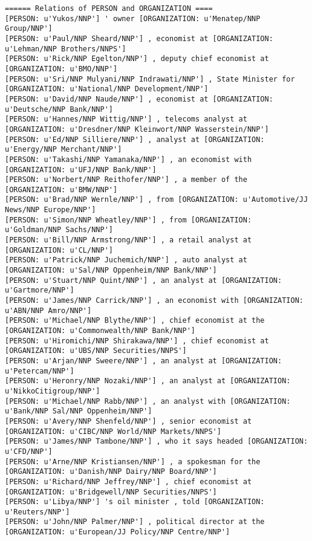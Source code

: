 \documentclass[12pt]{report}
\begin{document}
\begin{scriptsize}
\begin{verbatim}
====== Relations of PERSON and ORGANIZATION ====
[PERSON: u'Yukos/NNP'] ' owner [ORGANIZATION: u'Menatep/NNP Group/NNP']
[PERSON: u'Paul/NNP Sheard/NNP'] , economist at [ORGANIZATION: u'Lehman/NNP Brothers/NNPS']
[PERSON: u'Rick/NNP Egelton/NNP'] , deputy chief economist at [ORGANIZATION: u'BMO/NNP']
[PERSON: u'Sri/NNP Mulyani/NNP Indrawati/NNP'] , State Minister for [ORGANIZATION: u'National/NNP Development/NNP']
[PERSON: u'David/NNP Naude/NNP'] , economist at [ORGANIZATION: u'Deutsche/NNP Bank/NNP']
[PERSON: u'Hannes/NNP Wittig/NNP'] , telecoms analyst at [ORGANIZATION: u'Dresdner/NNP Kleinwort/NNP Wasserstein/NNP']
[PERSON: u'Ed/NNP Silliere/NNP'] , analyst at [ORGANIZATION: u'Energy/NNP Merchant/NNP']
[PERSON: u'Takashi/NNP Yamanaka/NNP'] , an economist with [ORGANIZATION: u'UFJ/NNP Bank/NNP']
[PERSON: u'Norbert/NNP Reithofer/NNP'] , a member of the [ORGANIZATION: u'BMW/NNP']
[PERSON: u'Brad/NNP Wernle/NNP'] , from [ORGANIZATION: u'Automotive/JJ News/NNP Europe/NNP']
[PERSON: u'Simon/NNP Wheatley/NNP'] , from [ORGANIZATION: u'Goldman/NNP Sachs/NNP']
[PERSON: u'Bill/NNP Armstrong/NNP'] , a retail analyst at [ORGANIZATION: u'CL/NNP']
[PERSON: u'Patrick/NNP Juchemich/NNP'] , auto analyst at [ORGANIZATION: u'Sal/NNP Oppenheim/NNP Bank/NNP']
[PERSON: u'Stuart/NNP Quint/NNP'] , an analyst at [ORGANIZATION: u'Gartmore/NNP']
[PERSON: u'James/NNP Carrick/NNP'] , an economist with [ORGANIZATION: u'ABN/NNP Amro/NNP']
[PERSON: u'Michael/NNP Blythe/NNP'] , chief economist at the [ORGANIZATION: u'Commonwealth/NNP Bank/NNP']
[PERSON: u'Hiromichi/NNP Shirakawa/NNP'] , chief economist at [ORGANIZATION: u'UBS/NNP Securities/NNPS']
[PERSON: u'Arjan/NNP Sweere/NNP'] , an analyst at [ORGANIZATION: u'Petercam/NNP']
[PERSON: u'Heronry/NNP Nozaki/NNP'] , an analyst at [ORGANIZATION: u'NikkoCitigroup/NNP']
[PERSON: u'Michael/NNP Rabb/NNP'] , an analyst with [ORGANIZATION: u'Bank/NNP Sal/NNP Oppenheim/NNP']
[PERSON: u'Avery/NNP Shenfeld/NNP'] , senior economist at [ORGANIZATION: u'CIBC/NNP World/NNP Markets/NNPS']
[PERSON: u'James/NNP Tambone/NNP'] , who it says headed [ORGANIZATION: u'CFD/NNP']
[PERSON: u'Arne/NNP Kristiansen/NNP'] , a spokesman for the [ORGANIZATION: u'Danish/NNP Dairy/NNP Board/NNP']
[PERSON: u'Richard/NNP Jeffrey/NNP'] , chief economist at [ORGANIZATION: u'Bridgewell/NNP Securities/NNPS']
[PERSON: u'Libya/NNP'] 's oil minister , told [ORGANIZATION: u'Reuters/NNP']
[PERSON: u'John/NNP Palmer/NNP'] , political director at the [ORGANIZATION: u'European/JJ Policy/NNP Centre/NNP']

\end{verbatim}
\end{scriptsize}
\end{document}
